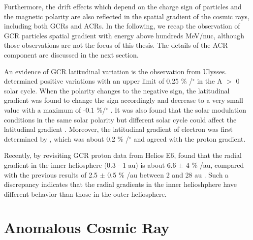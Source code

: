 Furthermore, the drift effects which depend on the charge sign of particles and the magnetic polarity are also reflected in the spatial gradient of the cosmic rays, including both \acp{GCR} and \acp{ACR}. In the following, we recap the observation of \ac{GCR} particles spatial gradient with energy above hundreds MeV/nuc, although those observations are not the focus of this thesis. The details of the \ac{ACR} component are discussed in the next section.

An evidence of \ac{GCR} latitudinal variation is the observation from Ulysses. \citet{Simpson1995GeoRL, Heber1996GeoRL, Heber1996AA} determined positive variations with an upper limit of 0.25 \% /$^\circ$  in the A $>$ 0 solar cycle. When the polarity changes to the negative sign, the latitudinal gradient was found to change the sign accordingly and decrease to a very small value with a maximum of -0.1 \%/$^\circ$ \citep{desimone2011ASTRA, Gieseler2016AA}. It was also found that the solar modulation conditions in the same solar polarity but different solar cycle could affect the latitudinal gradient \citep{Gieseler2016AA, Vos2016SoPh}. Moreover, the latitudinal gradient of electron was first determined by \citet{Heber2008ApJ}, which was about 0.2 \% /$^\circ$ and agreed with the proton gradient.

Recently, by revisiting \ac{GCR} proton data from Helios E6, \citet{Marquardt2019AA} found that the radial gradient in the inner heliosphere (0.3 - 1 au) is about 6.6 $\pm$ 4 \% /au, compared with the previous results of 2.5 $\pm$ 0.5 \% /au between 2 and 28 au \citep{Webber1981JGR}. Such a discrepancy indicates that the radial gradients in the inner helioshphere have different behavior than those in the outer heliosphere.


\section{Anomalous Cosmic Ray}


